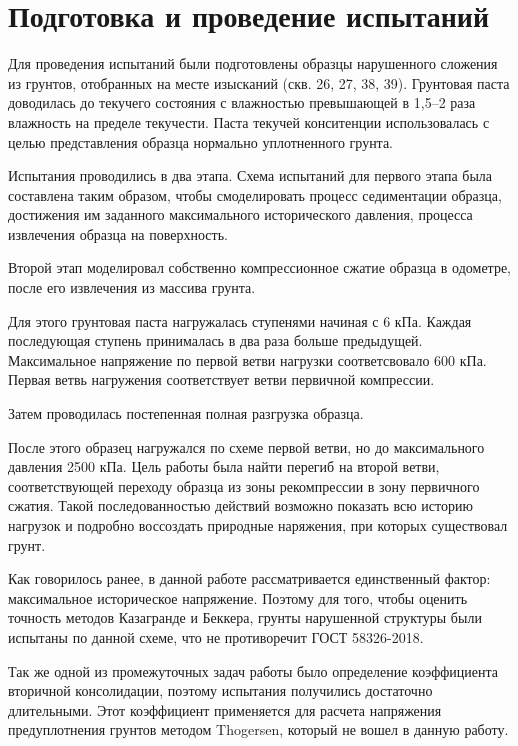 \section{Подготовка и проведение испытаний}

Для проведения испытаний были подготовлены образцы нарушенного сложения из грунтов, отобранных на месте изысканий (скв. 26, 27, 38, 39). Грунтовая паста доводилась до текучего состояния с влажностью превышающей в 1,5--2 раза влажность на пределе текучести. 
Паста текучей конситенции использовалась с целью представления образца нормально уплотненного грунта.

Испытания проводились в два этапа.
Схема испытаний для первого этапа была составлена таким образом, чтобы смоделировать процесс седиментации образца, достижения им заданного максимального исторического давления, процесса извлечения образца на поверхность.

Второй этап моделировал собственно компрессионное сжатие образца в одометре, после его извлечения из массива грунта.

Для этого грунтовая паста нагружалась ступенями начиная с 6 кПа.
Каждая последующая ступень принималась в два раза больше предыдущей.
Максимальное напряжение по первой ветви нагрузки соответсвовало 600 кПа.
Первая ветвь нагружения соответствует ветви первичной компрессии.

Затем проводилась постепенная полная разгрузка образца.

После этого образец нагружался по схеме первой ветви, но до максимального давления 2500 кПа.
Цель работы была найти перегиб на второй ветви, соответствующей переходу образца из зоны рекомпрессии в зону первичного сжатия.
Такой последованностью действий возможно показать всю историю нагрузок и подробно воссоздать природные наряжения, при которых существовал грунт. 

Как говорилось ранее, в данной работе рассматривается единственный фактор: максимальное историческое напряжение. Поэтому для того, чтобы оценить точность методов Казагранде и Беккера, грунты нарушенной структуры были испытаны по данной схеме, что не противоречит ГОСТ 58326-2018.

Так же одной из промежуточных задач работы было определение коэффициента вторичной консолидации, поэтому испытания получились достаточно длительными. Этот коэффициент применяется для расчета напряжения предуплотнения грунтов методом Thogersen, который не вошел в данную работу.
 

